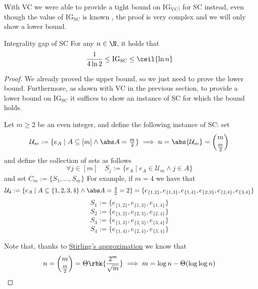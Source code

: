 \documentclass[a4paper, 12pt]{report}
\begin{document}
    With VC we were able to provide a tight bound on $\mathrm{IG_{VC}}$; for SC instead, even though the value of $\mathrm{IG_{SC}}$ is known \cite{ig_sc}, the proof is very complex and we will only show a lower bound.

    \begin{framedthm}{Integrality gap of SC}
        For any $n \in \N$, it holds that $$\dfrac{1}{4 \ln 2} \le \mathrm{IG_{SC}} \le \ceil{\ln n}$$
    \end{framedthm}
    
    \begin{proof}
        We already proved the upper bound, so we just need to prove the lower bound. Furthermore, as shown with VC in the previous section, to provide a lower bound on $\mathrm{IG_{SC}}$ it suffices to show an instance of SC for which the bound holds.

        Let $m \ge 2$ be an even integer, and define the following instance of SC: set $$\mathcal U_m := \{e_A \mid A \subseteq [m] \land \abs A  = \tfrac{m}{2}\} \implies n = \abs{\mathcal U_m}= \binom{m}{\tfrac{m}{2}}$$ and define the collection of sets as follows $$\forall j \in [m] \quad S_j := \{e_A \mid e_A \in \mathcal U_m \land j \in A\}$$ and set $C_m := \{S_1, \ldots, S_m\}$ For example, if $m = 4$ we have that $$\mathcal U_4 := \{e_A \mid A \subseteq \{1, 2, 3, 4\} \land \abs A = \tfrac{4}{2} = 2\} = \{e_{\{1, 2\}}, e_{\{1, 3\}}, e_{\{1, 4\}}, e_{\{2, 3\}}, e_{\{2, 4\}}, e_{\{3, 4\}}\}$$ $$S_1 := \{e_{\{1,2\}}, e_{\{1, 3\}}, e_{\{1,4\}}\}$$ $$S_2 := \{e_{\{1, 2\}}, e_{\{2, 3\}}, e_{\{2,4\}}\}$$ $$S_3 := \{e_{\{1, 3\}}, e_{\{2, 3\}}, e_{\{3, 4\}}\}$$ $$S_4 := \{e_{\{1, 4\}}, e_{\{2, 4\}}, e_{\{3, 4\}}\}$$

        Note that, thanks to \href{https://en.wikipedia.org/wiki/Stirling%27s_approximation}{Stirling's approximation} we know that $$n = \binom{m}{\tfrac{m}{2}} = \Theta \rbk{\dfrac{2^m}{\sqrt m}} \implies m = \log n - \Theta(\log \log n)$$



\end{proof}
\end{document}
